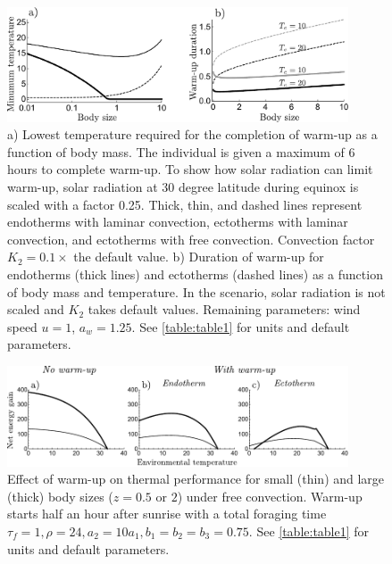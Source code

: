 \begin{figure}
\centering \includegraphics[width=0.9\textwidth]{fig3}
\caption{
    \setstretch{\stretchby}
	a) Lowest temperature required for the completion of warm-up as a function of body mass.
	The individual is given a maximum of 6 hours to complete warm-up.
	To show how solar radiation can limit warm-up, solar radiation at 30 degree latitude during equinox is scaled with a factor 0.25.
  Thick, thin, and dashed lines represent endotherms with laminar convection, ectotherms  with laminar convection, and ectotherms with free convection.
  Convection factor $K_2 = 0.1 \times$ the default value.
  b) Duration of warm-up for endotherms (thick lines) and ectotherms (dashed lines) as a function of body mass and temperature.
  In the scenario, solar radiation is not scaled and $K_2$ takes default values.
  Remaining parameters: wind speed  $u = 1$, $a_w = 1.25$.
	See \cref{table:table1} for units and default parameters.
}
\label{fig3}
\end{figure}
%
\begin{figure}
\centering \includegraphics[width=0.9\textwidth]{fig4}
\caption{
    \setstretch{\stretchby}
Effect of warm-up on thermal performance for small (thin) and large (thick) body sizes ($z = 0.5 \mbox{ or } 2$) under free convection.
Warm-up starts half an hour after sunrise with a total foraging time $\tau_f = 1, \rho = 24, a_2 = 10 a_1, b_1 = b_2 = b_3 = 0.75.$
	See \cref{table:table1} for units and default parameters.
}
\label{fig4}
\end{figure}

\clearpage

